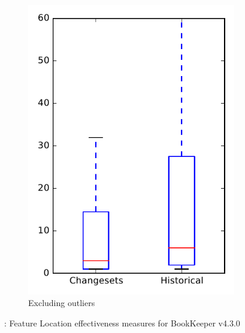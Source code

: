 \begin{figure}
\begin{subfigure}{.4\textwidth}
        \includegraphics[height=0.4\textheight]{figures/flt/rq2_bookkeeper_no_outlier}
        \caption{Excluding outliers}\label{fig:flt:rq2:bookkeeper_no_outlier}
    \end{subfigure}
\caption{\ftwo: Feature Location effectiveness measures for BookKeeper v4.3.0}
\label{fig:flt:rq2:bookkeeper}
\end{figure}
